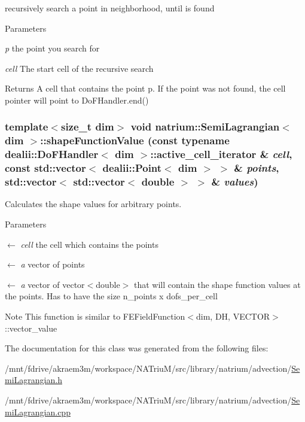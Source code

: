 recursively search a point in neighborhood, until is found 
\begin{DoxyParams}{Parameters}
\item[{\em p}]the point you search for \item[{\em cell}]The start cell of the recursive search \end{DoxyParams}
\begin{DoxyReturn}{Returns}
A cell that contains the point p. If the point was not found, the cell pointer will point to DoFHandler.end() 
\end{DoxyReturn}
\hypertarget{classnatrium_1_1SemiLagrangian_a108742ef40b532cb9e1e26384dafec94}{
\subsubsection[{shapeFunctionValue}]{\setlength{\rightskip}{0pt plus 5cm}template$<$size\_\-t dim$>$ void {\bf natrium::SemiLagrangian}$<$ dim $>$::shapeFunctionValue (const typename dealii::DoFHandler$<$ dim $>$::active\_\-cell\_\-iterator \& {\em cell}, \/  const std::vector$<$ dealii::Point$<$ dim $>$ $>$ \& {\em points}, \/  std::vector$<$ std::vector$<$ double $>$ $>$ \& {\em values})}}
\label{classnatrium_1_1SemiLagrangian_a108742ef40b532cb9e1e26384dafec94}


Calculates the shape values for arbitrary points. 
\begin{DoxyParams}{Parameters}
\item[\mbox{$\leftarrow$} {\em cell}]the cell which contains the points \item[\mbox{$\leftarrow$} {\em a}]vector of points \item[\mbox{$\leftarrow$} {\em a}]vector of vector$<$double$>$ that will contain the shape function values at the points. Has to have the size n\_\-points x dofs\_\-per\_\-cell \end{DoxyParams}
\begin{DoxyNote}{Note}
This function is similar to FEFieldFunction$<$dim, DH, VECTOR$>$::vector\_\-value 
\end{DoxyNote}


The documentation for this class was generated from the following files:\begin{DoxyCompactItemize}
\item 
/mnt/fdrive/akraem3m/workspace/NATriuM/src/library/natrium/advection/\hyperlink{SemiLagrangian_8h}{SemiLagrangian.h}\item 
/mnt/fdrive/akraem3m/workspace/NATriuM/src/library/natrium/advection/\hyperlink{SemiLagrangian_8cpp}{SemiLagrangian.cpp}\end{DoxyCompactItemize}
